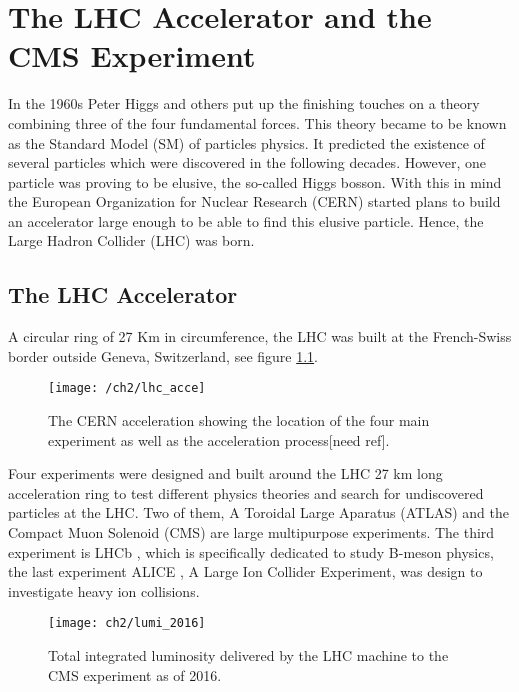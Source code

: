 
\chapter{The LHC Accelerator and the CMS Experiment}\label{ch:lhcandcms}
In the 1960s Peter Higgs and others {\color{red}} put up the finishing touches on a theory combining three of the four fundamental forces. This theory became to be known as the Standard Model (SM) of particles physics. It predicted the existence of several particles which were discovered in the following decades. However, one particle was proving to be elusive, the so-called Higgs bosson. With this in mind the European Organization for Nuclear Research (CERN) started plans to build an accelerator large enough to be able to find this elusive particle. Hence, the Large Hadron Collider (LHC) was born. 

\section{The LHC Accelerator}
A circular ring of 27 Km in circumference, the LHC was built at the French-Swiss border outside Geneva, Switzerland, see figure \ref{fig:cern}. 
{}
\begin{figure}[!h]
  \centering
  \texttt{[image: /ch2/lhc\_acce]}
  \caption[The CERN acceleration ]{The CERN acceleration  showing the location of the four main experiment as well as the acceleration process[need ref].}\label{fig:cern}
\end{figure}




Four experiments were designed and built around the LHC 27 km long acceleration ring to test different physics theories and search for undiscovered particles at the LHC. Two of them, A Toroidal Large Aparatus (ATLAS)\cite{atlas} and the Compact Muon Solenoid (CMS)\cite{cms_doc} are large multipurpose experiments. The third experiment is LHCb \cite{lhcb}, which is specifically dedicated to study B-meson physics, the last experiment ALICE \cite{alice}, A Large Ion Collider Experiment, was design to investigate heavy ion collisions.


\begin{figure}[!h]
	\centering
	\texttt{[image: ch2/lumi\_2016]}
	\caption[LHC luminosity]{Total integrated luminosity delivered by the LHC machine to the CMS experiment as of 2016.{}}
	\label{lumi2016}
\end{figure}


